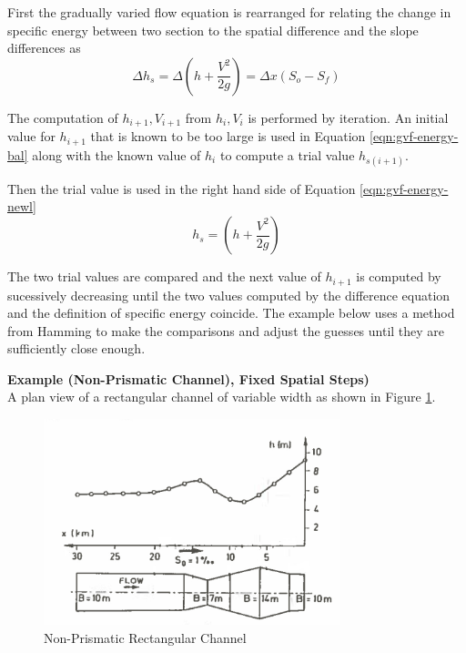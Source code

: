 First the gradually varied flow equation is rearranged for relating the change in specific energy between two section to the spatial difference and the slope differences as
\begin{equation}
\Delta h_s = \Delta (h + \frac{V^2}{2g}) = \Delta x (S_o - S_f)
\label{eqn:gvf-energy-bal}
\end{equation}

The computation of $h_{i+1},V_{i+1}$ from $h_i,V_i$ is performed by iteration.
An initial value for $h_{i+1}$ that is known to be too large is used in Equation \ref{eqn:gvf-energy-bal} along with the known value of $h_i$ to compute a trial value $h_{s(i+1)}$.

Then the trial value is used in the right hand side of Equation \ref{eqn:gvf-energy-newl}
\begin{equation}
h_s = (h + \frac{V^2}{2g})
\label{eqn:gvf-energy-newl}
\end{equation}

The two trial values are compared and the next value of $h_{i+1}$ is computed by sucessively decreasing until the two values computed by the difference equation and the definition of specific energy coincide.  The example below uses a method from Hamming to make the comparisons and adjust the guesses until they are sufficiently close enough.

\textbf{Example (Non-Prismatic Channel), Fixed Spatial Steps)}\\
A plan view of a rectangular channel of variable width as shown in Figure \ref{fig:NonPrismaticExample}.\\

\begin{figure}[h!] %
   \centering
   \includegraphics[width=3.4in]{NonPrismaticExample} 
   \caption{Non-Prismatic Rectangular Channel}
   \label{fig:NonPrismaticExample}
\end{figure}

